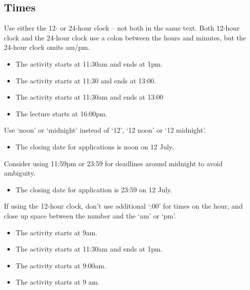 \documentclass[11pt,a4paper]{book}
\newcommand{\xmark}{{\color{cadmiumred}\ding{54}}}%
\newcommand{\cmark}{{\color{green(html/cssgreen)}\checkmark}}%
\begin{document}
			\subsection{Times}
			Use either the 12- or 24-hour clock -- not both in the same text. Both 12-hour clock and the 24-hour clock use a colon between the hours and minutes, but the 24-hour clock omits am/pm.
			{\firasans \begin{mdframed}[backgroundcolor=aliceblue] \begin{itemize}[label=\cmark]
				\item The activity starts at 11:30am and ends at 1pm.
				\item The activity starts at 11:30 and ends at 13:00.
				\item[\xmark] The activity starts at 11:30am and ends at 13:00
				\item[\xmark] The lecture starts at 16:00pm.
			\end{itemize} \end{mdframed} }
			Use `noon' or `midnight' instead of `12', `12 noon' or `12 midnight'.
			{\firasans \begin{mdframed}[backgroundcolor=aliceblue] \begin{itemize}[label=\cmark]
				\item The closing date for applications is noon on 12 July.
			\end{itemize} \end{mdframed} }
			Consider using 11:59pm or 23:59 for deadlines around midnight to avoid ambiguity.
			{\firasans \begin{mdframed}[backgroundcolor=aliceblue] \begin{itemize}[label=\cmark]
				\item The closing date for application is 23:59 on 12 July.
			\end{itemize} \end{mdframed} }
			If using the 12-hour clock, don't use additional `:00' for times on the hour, and close up space between the number and the `am' or `pm'.
			{\firasans \begin{mdframed}[backgroundcolor=aliceblue] \begin{itemize}[label=\cmark]
				\item The activity starts at 9am.
				\item The activity starts at 11:30am and ends at 1pm.
				\item[\xmark] The activity starts at 9:00am.
				\item[\xmark] The activity starts at 9 am.
			\end{itemize} \end{mdframed} }
		\newpage
\end{document}
